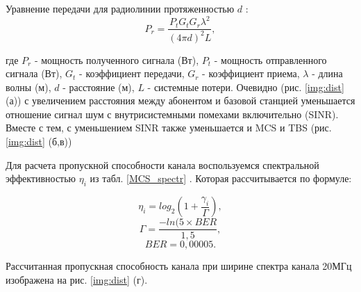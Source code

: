 Уравнение передачи для радиолинии протяженностью $d$ \cite{Friis}:
\begin{equation}\label{eq:friisNew}
P_{r}=\frac{P_{t}G_{t}G_{r}\lambda^{2}}{(4\pi d)^{2}L},
\end{equation}

\noindent где $P_{r}$ - мощность полученного сигнала (Вт), $P_{t}$ - мощность отправленного сигнала (Вт), $G_{t}$ - коэффициент передачи, $G_{r}$ - коэффициент приема, $\lambda$ - длина волны (м), $d$ - расстояние (м), $L$ - системные потери. Очевидно (рис. \ref{img:dist} (а)) с увеличением расстояния между абонентом и базовой станцией уменьшается отношение сигнал шум с внутрисистемными помехами включительно (SINR). Вместе с тем, с уменьшением SINR также уменьшается и MCS и TBS (рис. \ref{img:dist} (б,в))

Для расчета пропускной способности канала воспользуемся спектральной эффективностью $\eta_{i}$ из табл. \ref{MCS_spectr}  \cite{R1-081483}. Которая рассчитывается по формуле:

\begin{equation}\label{eq:spectr1}
\eta_{i}=log_{2}(1+\frac{\gamma_{i}}{\Gamma}),
\end{equation}
\begin{equation}\label{eq:spectr2}
\Gamma=\frac{-ln(5\times BER}{1,5},
\end{equation}
\begin{equation}\label{eq:spectr3}
BER=0,00005.
\end{equation}

Рассчитанная пропускная способность канала при ширине спектра канала  20МГц изображена на рис. \ref{img:dist} (г).




